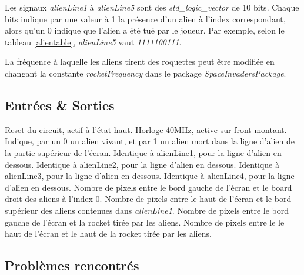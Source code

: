 \documentclass[french]{nakrule}
\begin{document}
Les signaux \emph{alienLine1} à \emph{alienLine5} sont des
\emph{std\_logic\_vector} de 10 bits. Chaque bits indique par une valeur à 1 la
présence d'un alien à l'index correspondant, alors qu'un 0 indique que l'alien a
été tué par le joueur. Par exemple, selon le tableau \ref{alientable},
\emph{alienLine5} vaut \emph{1111100111}.

La fréquence à laquelle les aliens tirent des roquettes peut être modifiée en
changant la constante \emph{rocketFrequency} dans le package \emph{SpaceInvadersPackage}.

\clearpage

\subsection{Entrées \& Sorties}
\label{subsec:Entrees_Sorties_alienRocket}

\begin{descr}
   Reset du circuit, actif à l'état haut.
   Horloge 40MHz, active sur front montant.
   Indique, par un 0 un alien vivant, et par 1 un alien
  mort dans la ligne d'alien de la partie supérieur de l'écran.
   Identique à alienLine1, pour la ligne d'alien en dessous.
   Identique à alienLine2, pour la ligne d'alien en dessous.
   Identique à alienLine3, pour la ligne d'alien en dessous.
   Identique à alienLine4, pour la ligne d'alien en dessous.
   Nombre de pixels entre le bord gauche de l'écran et le
  board droit des aliens à l'index 0.
   Nombre de pixels entre le haut de l'écran et le bord
  supérieur des aliens contenues dans \emph{alienLine1}.
   Nombre de pixels entre le bord gauche de l'écran et
  la rocket tirée par les aliens.
   Nombre de pixels entre le le haut de l'écran et le
  haut de la rocket tirée par les aliens.
\end{descr}

\subsection{Problèmes rencontrés}
\label{subsec:Problemes_rencontres_alienRocket}
\end{document}
